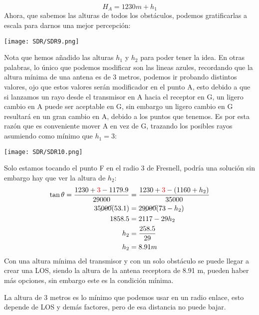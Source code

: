 \documentclass[
	12pt, %
	fleqn, %
	a4paper, %
	oneside, %
]{LegrandOrangeBook}
\begin{document}
\begin{example}
\begin{equation}
H_A=1230 m + h_1
\end{equation}
Ahora, que sabemos las alturas de todos los obstáculos, podemos gratificarlas a escala para darnos una mejor percepción:
\begin{center}
\texttt{[image: SDR/SDR9.png]}
\end{center}
Nota que hemos añadido las alturas $h_1$ y $h_2$ para poder tener la idea. En otras palabras, lo único que podemos modificar son las lineas azules, recordando que la altura mínima de una antena es de 3 metros, podemos ir probando distintos valores, ojo que estos valores serán modificador en el punto A, esto debido a que si lanzamos un rayo desde el transmisor en A hacia el receptor en G, un ligero cambio en A puede ser aceptable en G, sin embargo un ligero cambio en G resultará en un gran cambio en A, debido a los puntos que tenemos. Es por esta razón que es conveniente mover A en vez de G, trazando los posibles rayos asumiendo como mínimo que $h_1=3$:
\begin{center}
\texttt{[image: SDR/SDR10.png]}
\end{center}
Solo estamos tocando el punto F en el radio 3 de Fresnell, podría una solución sin embargo hay que ver la altura de $h_2$:
\begin{align}
\tan\theta=\frac{1230+\textcolor{red}{3}-1179.9}{29 000}&=\frac{1230+\textcolor{red}{3}-(1160+h_2)}{35 000}\\
35\cancel{000}(53.1)&=29\cancel{000}(73-h_2)\\
1858.5&=2117-29h_2\\
h_2&=\frac{258.5}{29}\\
h_2&=8.91 m
\end{align}
Con una altura mínima del transmisor y con un solo obstáculo se puede llegar a crear una LOS, siendo la altura de la antena receptora de 8.91 m, pueden haber más opciones, sin embargo este es la condición mínima.
\end{example}
\begin{remark}
La altura de 3 metros es lo mínimo que podemos usar en un radio enlace, esto depende de LOS y demás factores, pero de esa distancia no puede bajar.
\end{remark}
\end{document}

